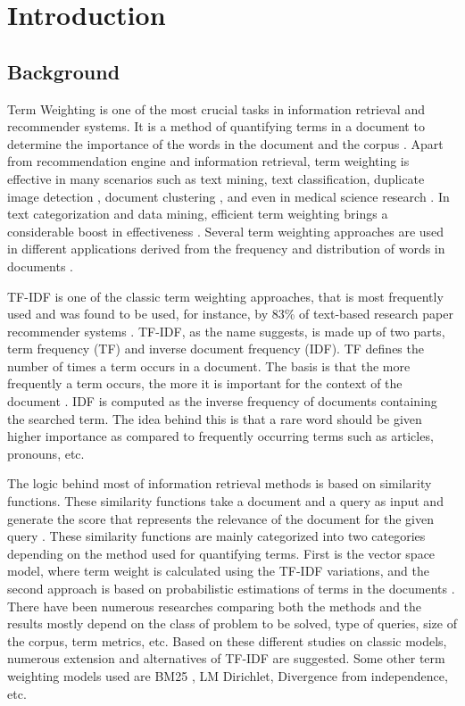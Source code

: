 
\chapter{Introduction}

	\section{Background}
	Term Weighting is one of the most crucial tasks in information retrieval and recommender systems. It is a method of quantifying terms in a document to determine the importance of the words in the document and the corpus \cite{RN13}. 
	Apart from recommendation engine and information retrieval, term weighting is effective in many scenarios such as text mining, text classification, duplicate image detection \cite{RN22}, document clustering \cite{RN21}, and even in medical science research \cite{matsuo2018semantic}. In text categorization and data mining, efficient term weighting brings a considerable boost in effectiveness \cite{RN24}. Several term weighting approaches are used in different applications derived from the frequency and distribution of words in documents \cite{RN24}. 
	
	TF-IDF is one of the classic term weighting approaches, that is most frequently used and was found to be used, for instance, by 83\% of text-based research paper recommender systems \cite{RN23}. TF-IDF, as the name suggests, is made up of two parts, term frequency (TF) and inverse document frequency (IDF). TF defines the number of times a term occurs in a document. The basis is that the more frequently a term occurs, the more it is important for the context of the document \cite{RN23}.  IDF is computed as the inverse frequency of documents containing the searched term. The idea behind this is that a rare word should be given higher importance as compared to frequently occurring terms such as articles, pronouns, etc. 
	
	The logic behind most of information retrieval methods is based on similarity functions. These similarity functions take a document and a query as input and generate the score that represents the relevance of the document for the given query \cite{RN26}. These similarity functions are mainly categorized into two categories depending on the method used for quantifying terms. First is the vector space model, where term weight is calculated using the TF-IDF variations, and the second approach is based on probabilistic estimations of terms in the documents \cite{RN14}. There have been numerous researches comparing both the methods and the results mostly depend on the class of problem to be solved, type of queries, size of the corpus, term metrics, etc. Based on these different studies on classic models, numerous extension and alternatives of TF-IDF are suggested. Some other term weighting models used are BM25 \cite{robertson2009probabilistic}, LM Dirichlet, Divergence from independence, etc. 
	
